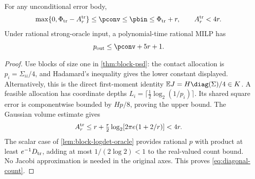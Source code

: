 \begin{corollary}\label{cor:diagonal-psd}
For any unconditional error body,
\begin{equation}\label{eq:diagonal-law}
 \max\{0,\Phi_{\rm tr}-A_r^{\rm tr}\}\le\pconv\le\pbin
 \le\Phi_{\rm tr}+r,\qquad A_r^{\rm tr}<4r.
\end{equation}
Under rational strong-oracle input, a polynomial-time rational MILP has
\begin{equation}\label{eq:diagonal-count}
 p_{\rm out}\le\pconv+5r+1.
\end{equation}
\end{corollary}
\begin{proof}
Use blocks of size one in \cref{thm:block-psd}: the contact allocation
is $p_i=\Sigma_{ii}/4$, and Hadamard's inequality gives the lower
constant displayed. Alternatively, this is the direct first-moment
identity $\mathbb EJ=H\diag(\Sigma)/4\in K$.
A feasible allocation has coordinate depths
$L_i=\lceil\frac12\log_2(1/p_i)\rceil$. Its shared square error is
componentwise bounded by $Hp/8$, proving the upper bound. The Gaussian
volume estimate gives
\[
 A_r^{\rm tr}\le r+\tfrac r2\log_2[2\pi e(1+2/r)]<4r.
\]
The scalar case of \cref{lem:block-logdet-oracle} provides rational $p$
with product at least $e^{-1}D_{\rm tr}$, adding at most
$1/(2\log2)<1$ to the real-valued count bound. No Jacobi approximation
is needed in the original axes. This proves \eqref{eq:diagonal-count}.
\end{proof}

